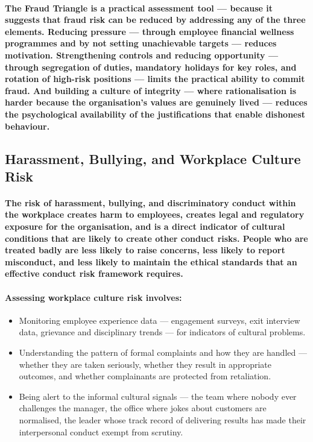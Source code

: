 \paragraph{The Fraud Triangle is a practical assessment tool — because it suggests that fraud risk can be reduced by addressing any of the three elements. Reducing pressure — through employee financial wellness programmes and by not setting unachievable targets — reduces motivation. Strengthening controls and reducing opportunity — through segregation of duties, mandatory holidays for key roles, and rotation of high-risk positions — limits the practical ability to commit fraud. And building a culture of integrity — where rationalisation is harder because the organisation's values are genuinely lived — reduces the psychological availability of the justifications that enable dishonest behaviour.}

\subsection{Harassment, Bullying, and Workplace Culture Risk}
\paragraph{The risk of harassment, bullying, and discriminatory conduct within the workplace creates harm to employees, creates legal and regulatory exposure for the organisation, and is a direct indicator of cultural conditions that are likely to create other conduct risks. People who are treated badly are less likely to raise concerns, less likely to report misconduct, and less likely to maintain the ethical standards that an effective conduct risk framework requires.}
\paragraph{Assessing workplace culture risk involves:}
\begin{itemize}
    \item{Monitoring employee experience data — engagement surveys, exit interview data, grievance and disciplinary trends — for indicators of cultural problems.}
    \item{Understanding the pattern of formal complaints and how they are handled — whether they are taken seriously, whether they result in appropriate outcomes, and whether complainants are protected from retaliation.}
    \item{Being alert to the informal cultural signals — the team where nobody ever challenges the manager, the office where jokes about customers are normalised, the leader whose track record of delivering results has made their interpersonal conduct exempt from scrutiny.}
\end{itemize}

